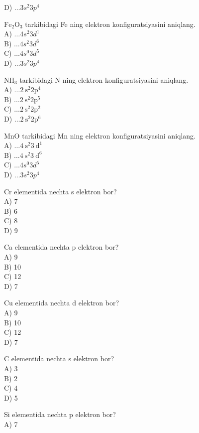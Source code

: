 D) $\ldots 3 s^{2} 3 p^{4}$
  \item $\mathrm{Fe}_{2} \mathrm{O}_{3}$ tarkibidagi Fe ning elektron konfiguratsiyasini aniqlang.\\
A) $\ldots 4 s^{2} 3 d^{1}$\\
B) $\ldots 4 s^{2} 3 d^{6}$\\
C) $\ldots 4 s^{0} 3 d^{5}$\\
D) $\ldots 3 s^{2} 3 p^{4}$
  \item $\mathrm{NH}_{3}$ tarkibidagi N ning elektron konfiguratsiyasini aniqlang.\\
A) $\ldots 2 \mathrm{~s}^{2} 2 \mathrm{p}^{4}$\\
B) $\ldots 2 \mathrm{~s}^{2} 2 \mathrm{p}^{5}$\\
C) $\ldots 2 \mathrm{~s}^{2} 2 \mathrm{p}^{2}$\\
D) $\ldots 2 \mathrm{~s}^{2} 2 \mathrm{p}^{6}$
  \item MnO tarkibidagi Mn ning elektron konfiguratsiyasini aniqlang.\\
A) $\ldots 4 \mathrm{~s}^{2} 3 \mathrm{~d}^{1}$\\
B) $\ldots 4 \mathrm{~s}^{2} 3 \mathrm{~d}^{6}$\\
C) $\ldots 4 s^{0} 3 d^{5}$\\
D) $\ldots 3 s^{2} 3 p^{4}$
  \item Cr elementida nechta s elektron bor?\\
A) 7\\
B) 6\\
C) 8\\
D) 9
  \item Ca elementida nechta p elektron bor?\\
A) 9\\
B) 10\\
C) 12\\
D) 7
  \item Cu elementida nechta d elektron bor?\\
A) 9\\
B) 10\\
C) 12\\
D) 7
  \item C elementida nechta s elektron bor?\\
A) 3\\
B) 2\\
C) 4\\
D) 5
  \item Si elementida nechta p elektron bor?\\
A) 7\\
